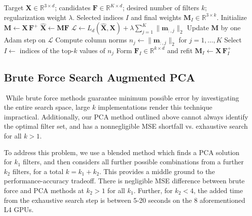 \begingroup
\setlength{\textfloatsep}{6pt}
\setlength{\floatsep}{6pt}
\setlength{\intextsep}{6pt}
\begin{algorithm}[H]
\caption{LASSO / group-sparse filter selection}
\label{alg:lasso-selection}
\begin{algorithmic}[1]
\Require Target $\mathbf{X}\in\mathbb{R}^{3\times d}$; candidates $\mathbf{F}\in\mathbb{R}^{K\times d}$; desired number of filters $k$; regularization weight $\lambda$.
\Ensure Selected indices $I$ and final weights $\boldsymbol{M}_{I}\in\mathbb{R}^{3\times k}$.
\State Initialize $\boldsymbol{M}\leftarrow \mathbf{X}\,\mathbf{F}^{+}$ 
    \State $\widehat{\mathbf{X}} \leftarrow \boldsymbol{M}\mathbf{F}$
    \State $\mathcal{L} \leftarrow L_d(\widehat{\mathbf{X}},\mathbf{X}) + \lambda \sum_{j=1}^{K}\|\boldsymbol{m}_{:,j}\|_2$
    \State Update $\boldsymbol{M}$ by one Adam step on $\mathcal{L}$
\EndFor
\State Compute column norms $n_j\leftarrow \|\boldsymbol{m}_{:,j}\|_2$ for $j=1,\dots,K$
\State Select $I\leftarrow$ indices of the top-$k$ values of $n_j$
\State Form $\mathbf{F}_{I}\in\mathbb{R}^{k\times d}$ and refit $\boldsymbol{M}_{I} \leftarrow \mathbf{X}\,\mathbf{F}_{I}^{+}$
\end{algorithmic}
\end{algorithm}
\endgroup


\subsection{Brute Force Search Augmented PCA} 

$\;$\newline While brute force methods guarantee minimum possible error by investigating the entire search space, large $k$ implementations render this technique impractical. 
Additionally, our PCA method outlined above cannot always identify the optimal filter set, and has a nonnegligible MSE shortfall vs. exhaustive search for all $k>1$.

To address this problem, we use a blended method which finds a PCA solution for $k_1$ filters, and then considers all further possible combinations from a further $k_2$ filters, for a total $k=k_1+k_2$. 
This provides a middle ground to the performance-accuracy tradeoff.
There is negligible MSE difference between brute force and PCA methods at $k_2>1$ for all $k_1$.
Further, for $k_2<4$, the added time from the exhaustive search step is between 5-20 seconds on the 8 aforementioned L4 GPUs.

